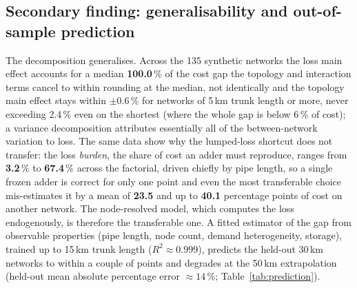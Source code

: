 \documentclass[a4paper,fleqn]{cas-sc}
\begin{document}
\subsection{Secondary finding: generalisability and out-of-sample prediction}
\label{subsec:generalis}
The decomposition generalises. Across the 135 synthetic networks the loss main effect accounts
for a median \textbf{100.0}\,\% of the cost gap the topology and interaction terms cancel to
within rounding at the median, not identically and the topology main effect stays
within $\pm$0.6\,\% for networks of 5\,km trunk length or more, never exceeding 2.4\,\% even on
the shortest (where the whole gap is below 6\,\% of cost); a variance decomposition attributes
essentially all of the between-network variation to loss. The same data show why the lumped-loss
shortcut does not transfer: %
the loss \emph{burden}, the share of cost an adder must reproduce,
ranges from \textbf{3.2}\,\% to \textbf{67.4}\,\% across the factorial,
driven chiefly by pipe length, so a single frozen adder is correct for only one point and even
the most transferable choice mis-estimates it by a mean of \textbf{23.5} and up to
\textbf{40.1} percentage points of cost on another network. The node-resolved
model, which computes the loss endogenously, is therefore the transferable one. A fitted
estimator of the gap from observable properties (pipe length, node count, demand heterogeneity,
storage), trained up to 15\,km trunk length ($R^2\approx0.999$), predicts the held-out 30\,km
networks to within a couple of points and degrades at the 50\,km extrapolation (held-out mean
absolute percentage error $\approx14$\,\%; Table~\ref{tab:prediction}).
\end{document}
